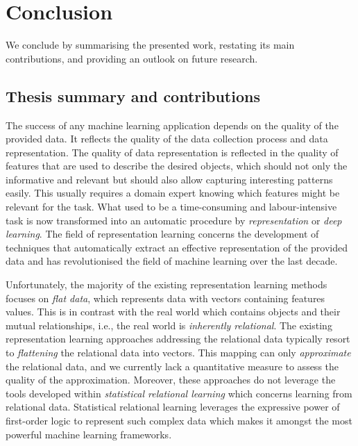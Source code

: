 \chapter{Conclusion}\label{ch:conclusion}


We conclude by summarising the presented work, restating its main contributions,
and providing an outlook on future research.



\section{Thesis summary and contributions}


The success of any machine learning application depends on the quality of the provided data.
It reflects the quality of the data collection process and data representation.
The quality of data representation is reflected in the quality of features that are used to describe the desired objects, which should not only the informative and relevant but should also allow capturing interesting patterns easily.
This usually requires a domain expert knowing which features might be relevant for the task.
What used to be a time-consuming and labour-intensive task is now transformed into an automatic procedure by \textit{representation} or \textit{deep learning}.
The field of representation learning concerns the development of techniques that automatically extract an effective representation of the provided data and has revolutionised the field of machine learning over the last decade.


Unfortunately,  the majority of the existing representation learning methods focuses on \textit{flat data}, which represents data with vectors containing features values.
This is in contrast with the real world which contains objects and their mutual relationships, i.e., the real world is \textit{inherently relational}.
The existing representation learning approaches addressing the relational data typically resort to \textit{flattening} the relational data into vectors.
This mapping can only \textit{approximate} the relational data, and we currently lack a quantitative measure to assess the quality of the approximation.
Moreover, these approaches do not leverage the tools developed within \textit{statistical relational learning} which concerns learning from relational data.
Statistical relational learning leverages the expressive power of first-order logic to represent such complex data which makes it amongst the most powerful machine learning frameworks.



